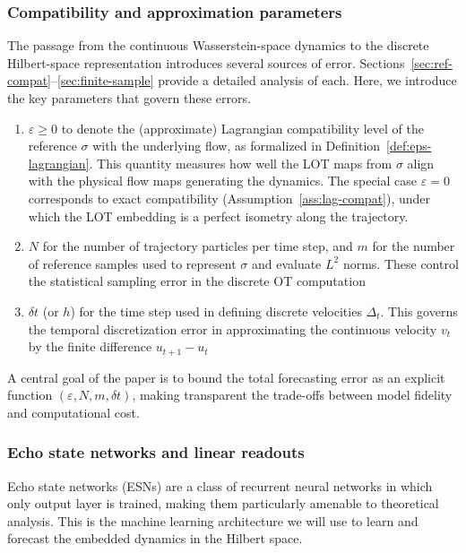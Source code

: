 \documentclass[11pt]{article}
\newcommand{\1}{\mathbf{1}}
\begin{document}
\subsubsection*{Compatibility and approximation parameters}\label{sec:prelim-compat}
The passage from the continuous Wasserstein-space dynamics to the discrete Hilbert-space representation introduces several sources of error. Sections~\ref{sec:ref-compat}--\ref{sec:finite-sample} provide a detailed analysis of each. Here, we introduce the key parameters that govern these errors.
\begin{enumerate}
\item $\varepsilon\ge 0$ to denote the (approximate) Lagrangian compatibility level of the reference $\sigma$ with the underlying flow, as formalized in Definition~\ref{def:eps-lagrangian}. This quantity measures how well the LOT maps from $\sigma$ align with the physical flow maps generating the dynamics. The special case $\varepsilon=0$ corresponds to exact compatibility (Assumption~\ref{ass:lag-compat}), under which the LOT embedding is a perfect isometry along the trajectory. 
\item $N$ for the number of trajectory particles per time step, and $m$ for the number of reference samples used to represent $\sigma$ and evaluate $L^2$ norms. These control the statistical sampling error in the discrete OT computation
\item $\delta t$ (or $h$) for the time step used in defining discrete velocities $\Delta_t$. This governs the temporal discretization error in approximating the continuous velocity $v_t$ by the finite difference $u_{t+1}-u_t$
\end{enumerate}

A central goal of the paper is to bound the total forecasting error as an explicit function $(\varepsilon, N, m, \delta t)$, making transparent the trade-offs between model fidelity and computational cost.


\subsubsection*{Echo state networks and linear readouts}\label{sec:prelim-esn}

Echo state networks (ESNs) are a class of recurrent neural networks in which only output layer is trained, making them particularly amenable to theoretical analysis. This is the machine learning architecture we will use to learn and forecast the embedded dynamics in the Hilbert space.
\end{document}
